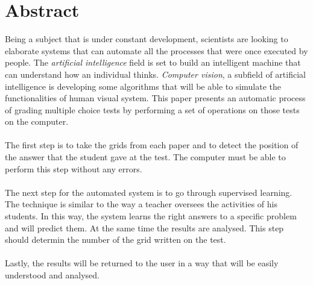 \documentclass[a4paper,12pt]{report}
\newcommand\tab[1][1cm]{\hspace*{#1}}
\begin{document}
\chapter*{Abstract}
\vspace{2cm}
\tab Being a subject that is under constant development, scientists are looking to elaborate systems that can automate all the processes that were once executed by people. The \textit{artificial intelligence} field is set to build an intelligent machine that can understand how an individual thinks. \textit{Computer vision}, a subfield of artificial intelligence is developing some algorithms that will be able to simulate the functionalities of human visual system. This paper presents an automatic process of grading multiple choice tests by performing a set of operations on those tests on the computer. 
\\ \tab \\ \tab The first step is to take the grids from each paper and to detect the position of the answer that the student gave at the test. The computer must be able to perform this step without any errors.
\\ \tab \\ \tab The next step for the automated system is to go through supervised learning. The technique is similar to the way a teacher oversees the activities of his students. In this way, the system learns the right answers to a specific problem and will predict them. At the same time the results are analysed. This step should determin the number of the grid written on the test.
\\ \tab \\ \tab Lastly, the results will be returned to the user in a way that will be easily understood and analysed.

\chapter*{}

\tableofcontents{}

\chapter*{}
\end{document}
